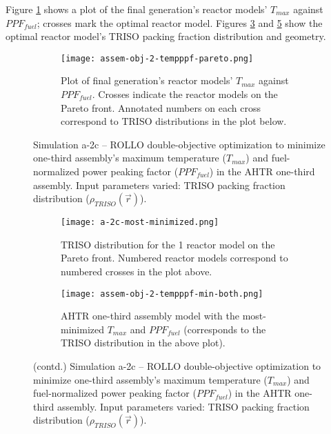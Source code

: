 Figure \ref{fig:assem-obj-2-tempppf-pareto} shows a plot of the final generation's 
reactor models' $T_{max}$ against $PPF_{fuel}$; crosses mark the optimal reactor model.
Figures \ref{fig:assem-obj-2-tempppf-pareto-distr} and 
\ref{fig:assem-obj-2-tempppf-min-tempppf} show the optimal reactor model's 
TRISO packing fraction distribution and geometry. 
\begin{figure}[htbp!]
    \centering
    \begin{subfigure}{\textwidth}
        \texttt{[image: assem-obj-2-tempppf-pareto.png]}
        \caption{Plot of final generation's reactor models' $T_{max}$ against 
        $PPF_{fuel}$. 
        Crosses indicate the reactor models on the Pareto front. Annotated numbers 
        on each cross correspond to TRISO distributions in the plot below.}
        \label{fig:assem-obj-2-tempppf-pareto} 
    \end{subfigure}
    \caption{Simulation a-2c -- ROLLO double-objective optimization to minimize 
    one-third assembly's maximum temperature ($T_{max}$) and fuel-normalized power peaking factor 
    ($PPF_{fuel}$) in the \gls{AHTR} one-third assembly. 
    Input parameters varied: TRISO packing fraction distribution ($\rho_{TRISO}(\vec{r})$).}
    \label{fig:assem-obj-2-tempppf}
\end{figure}
\begin{figure}[htbp!]
    \ContinuedFloat
    \begin{subfigure}{\textwidth}
        \centering
        \texttt{[image: a-2c-most-minimized.png]}
        \caption{TRISO distribution for the 1 reactor model on the Pareto front.
        Numbered reactor models correspond to numbered crosses in the plot above. }
        \label{fig:assem-obj-2-tempppf-pareto-distr} 
    \end{subfigure}
    \begin{subfigure}{\textwidth}
        \centering
        \texttt{[image: assem-obj-2-tempppf-min-both.png]}
        \caption{\gls{AHTR} one-third assembly model with the most-minimized $T_{max}$ and 
        $PPF_{fuel}$ (corresponds to the TRISO distribution in the above plot).}
        \label{fig:assem-obj-2-tempppf-min-tempppf} 
    \end{subfigure}
    \caption{(contd.) Simulation a-2c -- ROLLO double-objective optimization to minimize 
    one-third assembly's maximum temperature ($T_{max}$) and fuel-normalized power peaking factor 
    ($PPF_{fuel}$) in the \gls{AHTR} one-third assembly. 
    Input parameters varied: TRISO packing fraction distribution ($\rho_{TRISO}(\vec{r})$).}
\end{figure}

